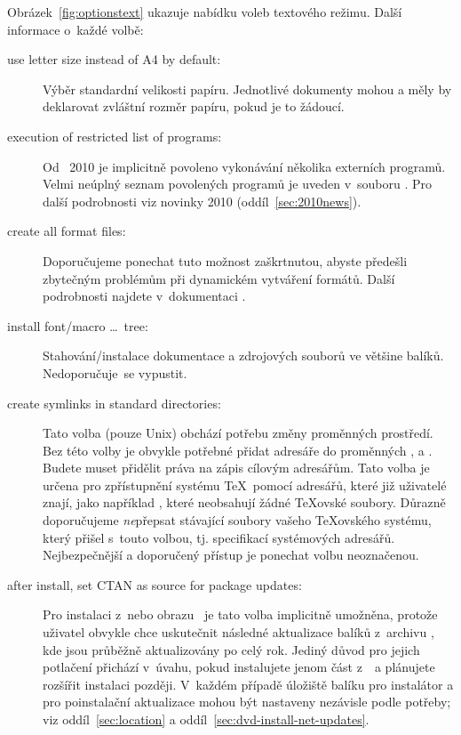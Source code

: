 \documentclass[\classoptions,slovak,english,czech]{\classname}
\begin{document}
Obrázek~\ref{fig:optionstext} ukazuje nabídku voleb textového režimu.
Další informace o~každé volbě:

\begin{description}
\item[use letter size instead of A4 by default:] Výběr standardní velikosti papíru.  
Jednotlivé dokumenty mohou a měly by deklarovat zvláštní 
rozměr papíru, pokud je to žádoucí.

\item[execution of restricted list of programs:] 
Od \TL\ 2010 je implicitně povoleno vykonávání
několika externích programů. Velmi neúplný seznam 
povolených programů je uveden v~souboru .
Pro další podrobnosti viz novinky 2010 (oddíl~\ref{sec:2010news}).

\item[create all format files:] Doporučujeme ponechat tuto možnost
zaškrtnutou, abyste předešli zbytečným problémům při dynamickém vytváření formátů. 
Další podrobnosti najdete v~dokumentaci . 

\item[install font/macro \ldots\ tree:] Stahování/instalace 
dokumentace a zdrojových souborů ve většine balíků.
Nedoporučuje~se vypustit.

\item[create symlinks in standard directories:] 
Tato volba (pouze Unix) obchází potřebu změny proměnných prostředí. Bez této 
volby je obvykle potřebné přidat adresáře \TL{} do proměnných
,  a . 
Budete muset přidělit práva na zápis cílovým adresářům. Tato volba je 
určena pro zpřístupnění systému \TeX\ pomocí adresářů, 
které již uživatelé znají, jako například , 
které neobsahují žádné \TeX ovské soubory. Důrazně doporučujeme \emph{ne}přepsat 
stávající soubory vašeho \TeX ovského systému, 
který přišel s~touto volbou, tj. specifikací systémových adresářů.
Nejbezpečnější a doporučený přístup je ponechat volbu neoznačenou.

\item[after install, set CTAN as source for package updates:]
Pro instalaci z~\DVD nebo obrazu \ISO\ je
tato volba implicitně umožněna, protože uživatel obvykle chce uskutečnit
následné aktualizace balíků z~archivu \CTAN, kde jsou průběžně 
aktualizovány po celý rok. Jediný důvod pro jejich potlačení 
přichází v~úvahu, pokud instalujete jenom část z~\DVD\ a plánujete
rozšířit instalaci později. V~každém případě úložiště balíku pro
instalátor a pro poinstalační aktualizace mohou být nastaveny nezávisle
podle potřeby; viz oddíl~\ref{sec:location}
 a oddíl~\ref{sec:dvd-install-net-updates}.
\end{description}
\end{document}
